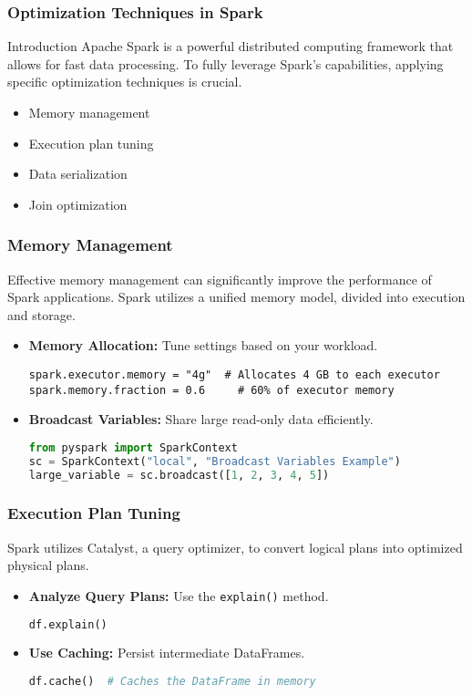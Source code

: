 \documentclass{beamer}
\begin{document}
\begin{frame}
    \frametitle{Optimization Techniques in Spark}
    \begin{block}{Introduction}
        Apache Spark is a powerful distributed computing framework that allows for fast data processing. 
        To fully leverage Spark's capabilities, applying specific optimization techniques is crucial. 
    \end{block}
    \begin{itemize}
        \item Memory management
        \item Execution plan tuning
        \item Data serialization
        \item Join optimization
    \end{itemize}
\end{frame}

\begin{frame}[fragile]
    \frametitle{Memory Management}
    Effective memory management can significantly improve the performance of Spark applications. 
    Spark utilizes a unified memory model, divided into execution and storage.

    \begin{itemize}
        \item \textbf{Memory Allocation:} Tune settings based on your workload.
        \begin{lstlisting}
spark.executor.memory = "4g"  # Allocates 4 GB to each executor
spark.memory.fraction = 0.6     # 60% of executor memory
        \end{lstlisting}
        
        \item \textbf{Broadcast Variables:} Share large read-only data efficiently.
        \begin{lstlisting}[language=Python]
from pyspark import SparkContext
sc = SparkContext("local", "Broadcast Variables Example")
large_variable = sc.broadcast([1, 2, 3, 4, 5])
        \end{lstlisting}
    \end{itemize}
\end{frame}

\begin{frame}[fragile]
    \frametitle{Execution Plan Tuning}
    Spark utilizes Catalyst, a query optimizer, to convert logical plans into optimized physical plans.

    \begin{itemize}
        \item \textbf{Analyze Query Plans:} Use the \texttt{explain()} method.
        \begin{lstlisting}[language=Python]
df.explain()
        \end{lstlisting}

        \item \textbf{Use Caching:} Persist intermediate DataFrames.
        \begin{lstlisting}[language=Python]
df.cache()  # Caches the DataFrame in memory
        \end{lstlisting}
    \end{itemize}
\end{frame}
\end{document}
